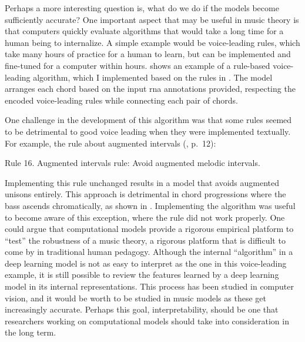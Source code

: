 

Perhaps a more interesting question is, what do we do if the
models become sufficiently accurate? One important aspect
that may be useful in music theory is that computers quickly
evaluate algorithms that would take a long time for a human
being to internalize. A simple example would be
voice-leading rules, which take many hours of practice for a
human to learn, but can be implemented and fine-tuned for a
computer within hours. 
shows an example of a rule-based voice-leading algorithm,
which I implemented based on the rules in
\textcite[p.~10]{huron2016voice}.
The model arranges each chord based on the input \gls{rna}
annotations provided, respecting the encoded voice-leading
rules while connecting each pair of chords. 


One challenge in the development of this algorithm was that
some rules seemed to be detrimental to good voice leading
when they were implemented textually. For example, the rule
about augmented intervals (\cite{huron2016voice}, p.~12):

\begin{italicsquote}
    Rule 16. Augmented intervals rule: Avoid augmented
    melodic intervals.
\end{italicsquote}

Implementing this rule unchanged results in a model that
avoids augmented unisons entirely. This approach is
detrimental in chord progressions where the bass ascends
chromatically, as shown in
. Implementing the
algorithm was useful to become aware of this exception,
where the rule did not work properly. One could argue that
computational models provide a rigorous empirical platform
to ``test'' the robustness of a music theory, a rigorous
platform that is difficult to come by in traditional human
pedagogy. Although the internal ``algorithm'' in a deep
learning model is not as easy to interpret as the one in
this voice-leading example, it is still possible to review
the features learned by a deep learning model in its
internal representations. This process has been studied in
computer vision, and it would be worth to be studied in
music models as these get increasingly accurate. Perhaps
this goal, interpretability, should be one that researchers
working on computational models should take into
consideration in the long term.
